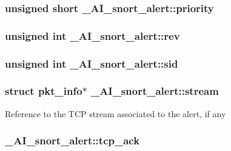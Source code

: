 \hypertarget{struct__AI__snort__alert_a25661fa4e212c5e30af5e6a892985ec9}{
\subsubsection[{priority}]{\setlength{\rightskip}{0pt plus 5cm}unsigned short {\bf \_\-AI\_\-snort\_\-alert::priority}}}
\label{struct__AI__snort__alert_a25661fa4e212c5e30af5e6a892985ec9}
\hypertarget{struct__AI__snort__alert_a864d3baa48586d6a31639f4cd27d9d37}{
\subsubsection[{rev}]{\setlength{\rightskip}{0pt plus 5cm}unsigned int {\bf \_\-AI\_\-snort\_\-alert::rev}}}
\label{struct__AI__snort__alert_a864d3baa48586d6a31639f4cd27d9d37}
\hypertarget{struct__AI__snort__alert_a3349aa68d2234f8ffd897367c3a8a137}{
\subsubsection[{sid}]{\setlength{\rightskip}{0pt plus 5cm}unsigned int {\bf \_\-AI\_\-snort\_\-alert::sid}}}
\label{struct__AI__snort__alert_a3349aa68d2234f8ffd897367c3a8a137}
\hypertarget{struct__AI__snort__alert_a09dfe0a841fd3912ec78060d4547cb31}{
\subsubsection[{stream}]{\setlength{\rightskip}{0pt plus 5cm}struct {\bf pkt\_\-info}$\ast$ {\bf \_\-AI\_\-snort\_\-alert::stream}}}
\label{struct__AI__snort__alert_a09dfe0a841fd3912ec78060d4547cb31}
Reference to the TCP stream associated to the alert, if any \hypertarget{struct__AI__snort__alert_a8aac577224a4325ec50511c6d79b4b79}{
\subsubsection[{tcp\_\-ack}]{ {\bf \_\-AI\_\-snort\_\-alert::tcp\_\-ack}}}

